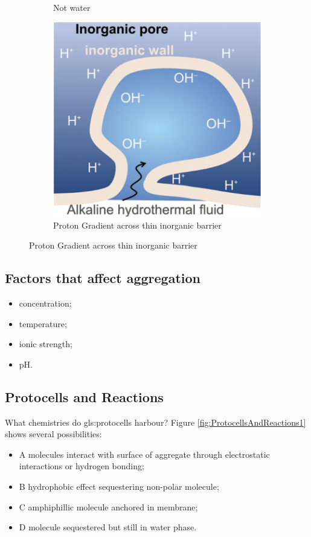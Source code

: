 \documentclass[]{article}
\begin{document}
\begin{figure}[H]
\begin{subfigure}[b]{0.3\textwidth}
		\caption{Not water}
		\label{fig:not-water}
	\end{subfigure}
	\hfill
	\begin{subfigure}[b]{0.3\textwidth}
		\centering
		\includegraphics[width=\textwidth]{SelfAssembled3}
		\caption{Proton Gradient across thin inorganic barrier}
		\label{fig:proton-gradient}
	\end{subfigure}

\end{figure}


\subsection{Factors that affect aggregation}
\begin{itemize}
	\item concentration;
	\item temperature;
	\item ionic strength;
	\item pH.
\end{itemize}

\subsection{Protocells and Reactions}

What chemistries do \glspl{gls:protocell} harbour? Figure \ref{fig:ProtocellsAndReactions1} shows several possibilities:
\begin{itemize}
	\item A molecules interact with surface of aggregate through electrostatic interactions or hydrogen bonding;
	\item B hydrophobic effect sequestering non-polar molecule;
	\item C amphiphillic molecule anchored in membrane; 
	\item D molecule sequestered but still in water phase.
\end{itemize}
\end{document}
